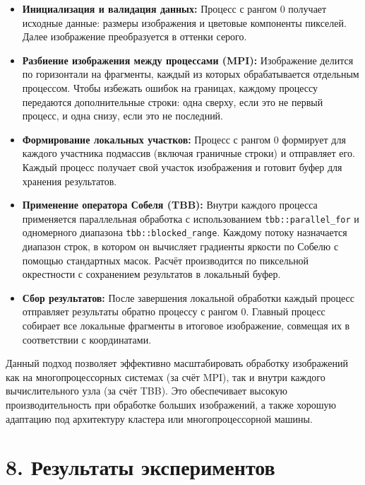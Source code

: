 \documentclass{report}
\begin{document}
\begin{itemize}
\item \textbf{Инициализация и валидация данных:} Процесс с рангом 0 получает исходные данные: размеры изображения и цветовые компоненты пикселей. Далее изображение преобразуется в оттенки серого.
\item \textbf{Разбиение изображения между процессами (MPI):} Изображение делится по горизонтали на фрагменты, каждый из которых обрабатывается отдельным процессом. Чтобы избежать ошибок на границах, каждому процессу передаются дополнительные строки: одна сверху, если это не первый процесс, и одна снизу, если это не последний.

\item \textbf{Формирование локальных участков:} Процесс с рангом 0 формирует для каждого участника подмассив (включая граничные строки) и отправляет его. Каждый процесс получает свой участок изображения и готовит буфер для хранения результатов.

\item \textbf{Применение оператора Собеля (TBB):} Внутри каждого процесса применяется параллельная обработка с использованием \texttt{tbb::parallel\_for} и одномерного диапазона \texttt{tbb::blocked\_range}. Каждому потоку назначается диапазон строк, в котором он вычисляет градиенты яркости по Собелю с помощью стандартных масок. Расчёт производится по пиксельной окрестности с сохранением результатов в локальный буфер.

\item \textbf{Сбор результатов:} После завершения локальной обработки каждый процесс отправляет результаты обратно процессу с рангом 0. Главный процесс собирает все локальные фрагменты в итоговое изображение, совмещая их в соответствии с координатами.

\end{itemize}

Данный подход позволяет эффективно масштабировать обработку изображений как на многопроцессорных системах (за счёт MPI), так и внутри каждого вычислительного узла (за счёт TBB). Это обеспечивает высокую производительность при обработке больших изображений, а также хорошую адаптацию под архитектуру кластера или многопроцессорной машины.

\newpage
\section*{8. Результаты экспериментов}
\justifying
\end{document}
